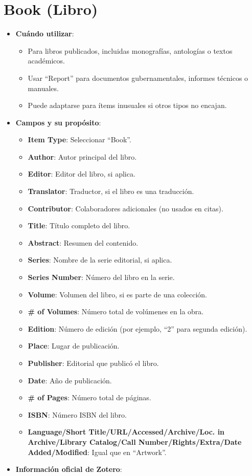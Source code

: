 \documentclass[
  jou,
  floatsintext,
  longtable,
  a4paper,
  nolmodern,
  notxfonts,
  notimes,
  12pt,
  colorlinks=true,linkcolor=blue,citecolor=blue,urlcolor=blue]{apa7}
\providecommand{\tightlist}{%
  \setlength{\itemsep}{0pt}\setlength{\parskip}{0pt}}
\begin{document}
\section{Book (Libro)}\label{book-libro}

\begin{itemize}
\tightlist
\item
  \textbf{Cuándo utilizar}:

  \begin{itemize}
  \tightlist
  \item
    Para libros publicados, incluidas monografías, antologías o textos
    académicos.
  \item
    Usar ``Report'' para documentos gubernamentales, informes técnicos o
    manuales.
  \item
    Puede adaptarse para ítems inusuales si otros tipos no encajan.
  \end{itemize}
\item
  \textbf{Campos y su propósito}:

  \begin{itemize}
  \tightlist
  \item
    \textbf{Item Type}: Seleccionar ``Book''.
  \item
    \textbf{Author}: Autor principal del libro.
  \item
    \textbf{Editor}: Editor del libro, si aplica.
  \item
    \textbf{Translator}: Traductor, si el libro es una traducción.
  \item
    \textbf{Contributor}: Colaboradores adicionales (no usados en
    citas).
  \item
    \textbf{Title}: Título completo del libro.
  \item
    \textbf{Abstract}: Resumen del contenido.
  \item
    \textbf{Series}: Nombre de la serie editorial, si aplica.
  \item
    \textbf{Series Number}: Número del libro en la serie.
  \item
    \textbf{Volume}: Volumen del libro, si es parte de una colección.
  \item
    \textbf{\# of Volumes}: Número total de volúmenes en la obra.
  \item
    \textbf{Edition}: Número de edición (por ejemplo, ``2'' para segunda
    edición).
  \item
    \textbf{Place}: Lugar de publicación.
  \item
    \textbf{Publisher}: Editorial que publicó el libro.
  \item
    \textbf{Date}: Año de publicación.
  \item
    \textbf{\# of Pages}: Número total de páginas.
  \item
    \textbf{ISBN}: Número ISBN del libro.
  \item
    \textbf{Language/Short Title/URL/Accessed/Archive/Loc. in
    Archive/Library Catalog/Call Number/Rights/Extra/Date
    Added/Modified}: Igual que en ``Artwork''.
  \end{itemize}
\item
  \textbf{Información oficial de Zotero}:


\end{itemize}
\end{document}
